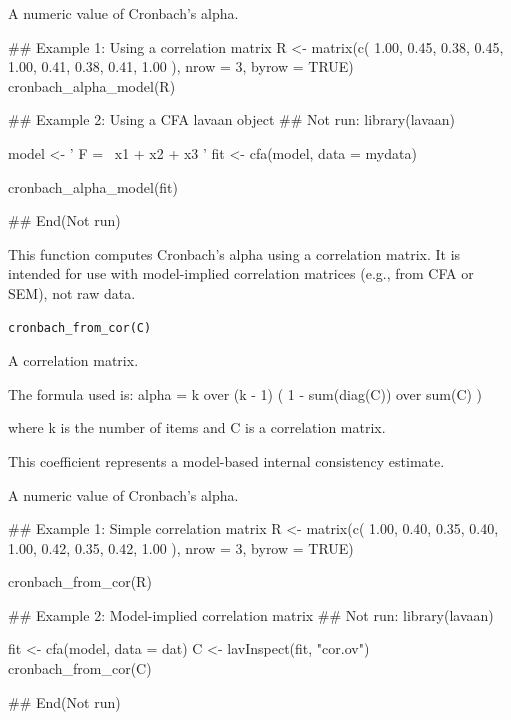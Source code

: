 \documentclass[a4paper]{book}
\begin{document}
%
\begin{Value}
A numeric value of Cronbach's alpha.
\end{Value}
%
\begin{Examples}
\begin{ExampleCode}
## Example 1: Using a correlation matrix
R <- matrix(c(
  1.00, 0.45, 0.38,
  0.45, 1.00, 0.41,
  0.38, 0.41, 1.00
), nrow = 3, byrow = TRUE)
cronbach_alpha_model(R)

## Example 2: Using a CFA lavaan object
## Not run: 
library(lavaan)

model <- '
  F =~ x1 + x2 + x3
'
fit <- cfa(model, data = mydata)

cronbach_alpha_model(fit)

## End(Not run)

\end{ExampleCode}
\end{Examples}
%
\begin{Description}
This function computes Cronbach's alpha using a correlation matrix.
It is intended for use with model-implied correlation matrices
(e.g., from CFA or SEM), not raw data.
\end{Description}
%
\begin{Usage}
\begin{verbatim}
cronbach_from_cor(C)
\end{verbatim}
\end{Usage}
%
\begin{Arguments}
\begin{ldescription}
\item[\code{C}] A correlation matrix.
\end{ldescription}
\end{Arguments}
%
\begin{Details}
The formula used is:
alpha = k over (k - 1) ( 1 - sum(diag(C)) over sum(C) )

where k is the number of items and C is a correlation matrix.

This coefficient represents a model-based internal consistency estimate.
\end{Details}
%
\begin{Value}
A numeric value of Cronbach's alpha.
\end{Value}
%
\begin{Examples}
\begin{ExampleCode}
## Example 1: Simple correlation matrix
R <- matrix(c(
  1.00, 0.40, 0.35,
  0.40, 1.00, 0.42,
  0.35, 0.42, 1.00
), nrow = 3, byrow = TRUE)

cronbach_from_cor(R)

## Example 2: Model-implied correlation matrix
## Not run: 
library(lavaan)

fit <- cfa(model, data = dat)
C <- lavInspect(fit, "cor.ov")
cronbach_from_cor(C)

## End(Not run)

\end{ExampleCode}
\end{Examples}
\end{document}
